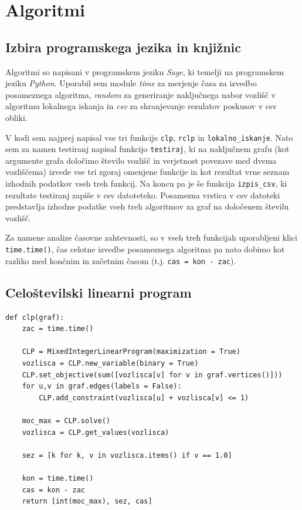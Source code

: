 \documentclass[a4paper, 12 pt]{article}
\theoremstyle{definition}
\theoremstyle{plain}
\theoremstyle{remark}
\begin{document}
\newpage
\section{Algoritmi} %
\subsection{Izbira programskega jezika in knjižnic}
Algoritmi so napisani v programskem jeziku \textit{Sage}, ki temelji na programskem jeziku \textit{Python}. Uporabil sem module \textit{time} za merjenje časa za izvedbo posameznega algoritma, \textit{random} za generiranje naključnega nabor vozlišč v algoritmu lokalnega iskanja in \textit{csv} za shranjevanje rezulatov poskusov v csv obliki.

V kodi sem najprej napisal vse tri funkcije \verb|clp|, \verb|rclp| in \verb|lokalno_iskanje|. Nato sem za namen testiranj napisal funkcijo \verb|testiraj|, ki na naključnem grafu (kot argumente grafa določimo število vozlišč in verjetnost povezave med dvema vozliščema) izvede vse tri zgoraj omenjene funkcije in kot rezultat vrne seznam izhodnih podatkov vseh treh funkcij. Na koncu pa je še funkcija \verb|izpis_csv|, ki rezultate testiranj zapiše v csv datoteteko. Posamezna vrstica v csv datoteki predstavlja izhodne podatke vseh treh algoritmov za graf na določenem številu vozlišč.

Za namene analize časovne zahtevnosti, so v vseh treh funkcijah uporabljeni klici \verb|time.time()|, čas celotne izvedbe posameznega algoritma pa nato dobimo kot razliko med končnim in začetnim časom (t.j. \verb|cas = kon - zac|).

\subsection{Celoštevilski linearni program} \label{CLP}
\begin{verbatim}
def clp(graf):
    zac = time.time()

    CLP = MixedIntegerLinearProgram(maximization = True) 
    vozlisca = CLP.new_variable(binary = True) 
    CLP.set_objective(sum([vozlisca[v] for v in graf.vertices()])) 
    for u,v in graf.edges(labels = False):
        CLP.add_constraint(vozlisca[u] + vozlisca[v] <= 1) 

    moc_max = CLP.solve() 
    vozlisca = CLP.get_values(vozlisca) 

    sez = [k for k, v in vozlisca.items() if v == 1.0]

    kon = time.time() 
    cas = kon - zac
    return [int(moc_max), sez, cas]
\end{verbatim}
\newpage
\end{document}
